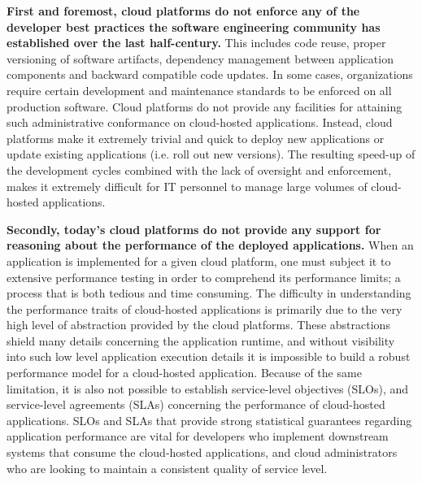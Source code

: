 \textbf{First and foremost, cloud platforms do not enforce any of the developer best practices
the software engineering community has established over the last half-century.} This
includes code reuse, proper versioning of software artifacts, dependency management
between application components and backward compatible code updates. In
some cases, organizations require certain development and maintenance standards to be enforced on
all production software. Cloud platforms do not provide any facilities for attaining
such administrative conformance on cloud-hosted applications. Instead, cloud platforms
make it extremely trivial and quick to deploy new applications or update existing
applications (i.e. roll out new versions). The resulting speed-up of the development cycles combined with the lack of 
oversight and enforcement, makes it extremely difficult for 
IT personnel to manage large volumes of cloud-hosted applications.

\textbf{Secondly, today's cloud platforms do not provide any support for reasoning about the 
performance of the deployed applications.} When an application is implemented for
a given cloud platform, one must subject it to extensive performance testing in order
to comprehend its performance limits; a process that is both 
tedious and time consuming. The difficulty in understanding the performance 
traits of cloud-hosted applications is primarily due to the very high level of 
abstraction provided by the cloud platforms. These abstractions shield many details 
concerning the application runtime, and without visibility into such low level application 
execution details it is impossible
to build a robust performance model for a cloud-hosted application. Because of the same
limitation, it is also not possible to establish service-level objectives (SLOs), and 
service-level agreements (SLAs) concerning
the performance of cloud-hosted applications. SLOs and SLAs that provide strong
statistical guarantees regarding application performance are vital for developers 
who implement downstream systems that consume the cloud-hosted applications,
and cloud administrators who are looking to maintain a consistent quality of service
level.

